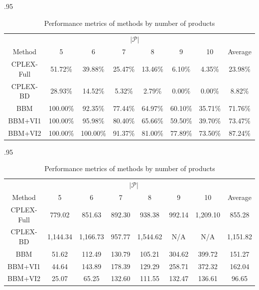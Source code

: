 \documentclass[12pt]{article}
\theoremstyle{thmstylethree}%
\begin{document}
\begin{table}[htp]
\begin{subtable}[c]{.95\textwidth}
\center
\tiny
\begin{tabular}{|c|c|c|c|c|c|c|c|}
\hline
& \multicolumn{6}{c|}{$\vert \mathcal{P} \vert$} &  \\
Method & 5 & 6 & 7 & 8 & 9 & 10 & Average \\
\hline
CPLEX-Full & 51.72\% & 39.88\% & 25.47\% & 13.46\% & 6.10\% & 4.35\% & 23.98\% \\
CPLEX-BD & 28.93\% & 14.52\% & 5.32\% & 2.79\% & 0.00\% & 0.00\% & 8.82\% \\
BBM & 100.00\% & 92.35\% & 77.44\% & 64.97\% & 60.10\% & 35.71\% & 71.76\% \\
BBM+VI1 & 100.00\% & 95.98\% & 80.40\% & 65.66\% & 59.50\% & 39.70\% & 73.47\% \\
BBM+VI2 & 100.00\% & 100.00\% & 91.37\% & 81.00\% & 77.89\% & 73.50\% & 87.24\% \\
\hline
\end{tabular}
\label{tbl:bd_pct_solved_byp}
\end{subtable}
\begin{subtable}[c]{.95\textwidth}
\center
\tiny
\begin{tabular}{|c|c|c|c|c|c|c|c|}
\hline
& \multicolumn{6}{c|}{$\vert \mathcal{P} \vert$}  & \\
 Method & 5 & 6 & 7 & 8 & 9 & 10 & Average \\
 \hline
CPLEX-Full &  779.02  &  851.63  &  892.30  &  938.38  &  992.14  &  1,209.10  &  855.28  \\
CPLEX-BD &  1,144.34  &  1,166.73  &  957.77  &  1,544.62  & N/A& N/A &  1,151.82  \\
BBM &  51.62  &  112.49  &  130.79  &  105.21  &  304.62  &  399.72  &  151.27  \\
BBM+VI1 &  44.64  &  143.89  &  178.39  &  129.29  &  258.71  &  372.32  &  162.04  \\
BBM+VI2 &  25.07  &  65.25  &  132.60  &  111.55  &  132.47  &  136.61  &  96.65  \\
\hline
\end{tabular}
\label{tbl:bd_solve_time_byp}
\end{subtable}
\caption{Performance metrics of methods by number of products}
\end{table}
\end{document}
